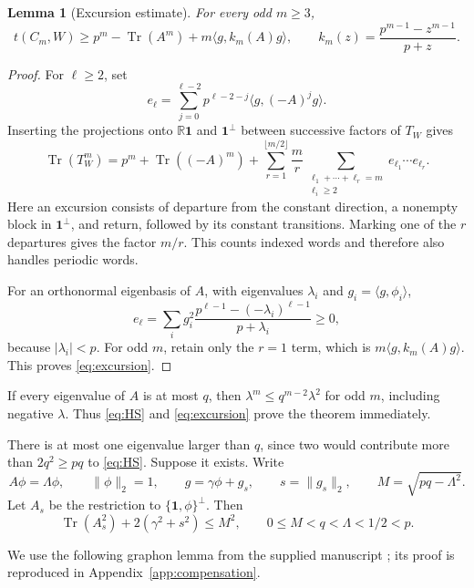 \documentclass[11pt]{article}
\newtheorem{lemma}[theorem]{Lemma}
\theoremstyle{remark}
\newcommand{\one}{\mathbf 1}
\newcommand{\Tr}{\operatorname{Tr}}
\newcommand{\ip}[2]{\langle #1,#2\rangle}
\newcommand{\norm}[1]{\lVert #1\rVert_2}
\begin{document}
\begin{lemma}[Excursion estimate]\label{lem:excursion}
For every odd $m\ge3$,
\begin{equation}\label{eq:excursion}
 t(C_m,W)\ge p^m-\Tr(A^m)+m\ip g{k_m(A)g},
 \qquad
 k_m(z)=\frac{p^{m-1}-z^{m-1}}{p+z}.
\end{equation}
\end{lemma}

\begin{proof}
For $\ell\ge2$, set
\[
 e_\ell=\sum_{j=0}^{\ell-2}p^{\ell-2-j}\ip g{(-A)^jg}.
\]
Inserting the projections onto $\mathbb R\one$ and $\one^\perp$ between successive factors of $T_W$ gives
\[
 \Tr(T_W^m)=p^m+\Tr((-A)^m)
 +\sum_{r=1}^{\lfloor m/2\rfloor}\frac mr
   \sum_{\substack{\ell_1+\cdots+\ell_r=m\\\ell_i\ge2}}
   e_{\ell_1}\cdots e_{\ell_r}.
\]
Here an excursion consists of departure from the constant direction, a nonempty block in $\one^\perp$, and return, followed by its constant transitions. Marking one of the $r$ departures gives the factor $m/r$. This counts indexed words and therefore also handles periodic words.

For an orthonormal eigenbasis of $A$, with eigenvalues $\lambda_i$ and $g_i=\ip g{\phi_i}$,
\[
 e_\ell=\sum_i g_i^2\frac{p^{\ell-1}-(-\lambda_i)^{\ell-1}}{p+\lambda_i}\ge0,
\]
because $|\lambda_i|<p$. For odd $m$, retain only the $r=1$ term, which is $m\ip g{k_m(A)g}$. This proves \eqref{eq:excursion}.
\end{proof}

If every eigenvalue of $A$ is at most $q$, then $\lambda^m\le q^{m-2}\lambda^2$ for odd $m$, including negative $\lambda$. Thus \eqref{eq:HS} and \eqref{eq:excursion} prove the theorem immediately.

There is at most one eigenvalue larger than $q$, since two would contribute more than $2q^2\ge pq$ to \eqref{eq:HS}. Suppose it exists. Write
\begin{equation}\label{eq:exceptional}
 A\phi=\Lambda\phi,\qquad \norm\phi=1,\qquad
 g=\gamma\phi+g_s,\qquad s=\norm{g_s},\qquad
 M=\sqrt{pq-\Lambda^2}.
\end{equation}
Let $A_s$ be the restriction to $\{\one,\phi\}^\perp$. Then
\begin{equation}\label{eq:tail}
 \Tr(A_s^2)+2(\gamma^2+s^2)\le M^2,
 \qquad 0\le M<q<\Lambda<1/2<p.
\end{equation}

We use the following graphon lemma from the supplied manuscript \cite[Lemma 5]{companion}; its proof is reproduced in Appendix~\ref{app:compensation}.
\end{document}
